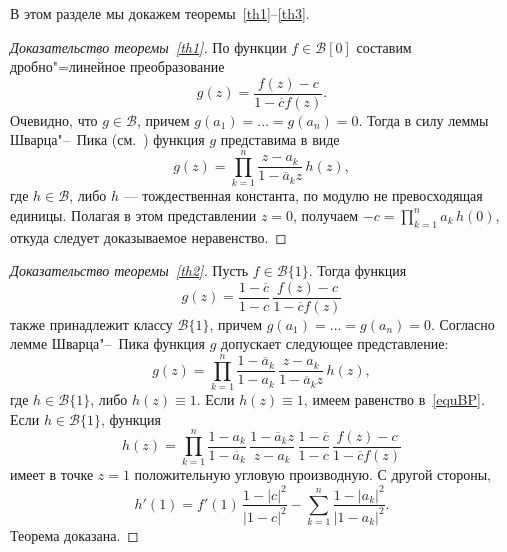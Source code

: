 \documentclass{article}
\theoremstyle{definition}
\theoremstyle{plain}
\begin{document}
 В этом разделе мы докажем теоремы~\ref{th1}--\ref{th3}.
\begin{proof}[Доказательство теоремы~\ref{th1}]
	По функции 	$f\in \mathscr B[0]$ составим дробно"=линейное преобразование
	\[
	g(z)=\frac{f(z)-c}{1-\overline{c}f(z)}.
	\]	
	Очевидно, что $g\in \mathscr B$, причем $g(a_1)=\ldots =g(a_n)=0$. Тогда в силу  леммы Шварца"--~Пика (см.~\cite[гл.~VIII, \S~1]{Goluzin})  функция $g$ представима в виде
	\begin{equation*}
		g(z)=\prod_{k=1}^{n}\frac{z-a_k}{1-\overline{a}_k z} \,h(z),	
	\end{equation*}	
	где $h\in \mathscr B$, либо $h$ --- тождественная константа, по модулю не превосходящая единицы. Полагая в этом представлении
	$z=0$, получаем $-c =\prod_{k=1}^{n}a_k \,h(0)$, откуда следует доказываемое неравенство.
\end{proof}	
\begin{proof}[Доказательство теоремы~\ref{th2}]
	Пусть  $f\in \mathscr B\{1\}$.
	Тогда функция
	\[
	g(z)=\frac{1-\overline{c}}{1-c}\,\frac{f(z)-c}{1-\overline{c}f(z)}
	\]	
	также принадлежит классу $\mathscr B\{1\}$, причем $g(a_1)=\ldots =g(a_n)=0$. Согласно лемме Шварца"--~Пика  функция $g$ допускает следующее представление:
	\begin{equation*}
		g(z)=
		\prod_{k=1}^{n}
		\frac{1-\overline{a}_k}{1-a_k}\,\frac{z-a_k}{1-\overline{a}_kz}\, h(z),	
	\end{equation*}	
	где $h\in \mathscr B\{1\}$, либо $h(z)\equiv 1$. Если $h(z)\equiv 1$, имеем равенство в~\eqref{equBP}. Если $h\in \mathscr B\{1\}$,
	функция
	\[
	h(z)=
	\prod_{k=1}^{n}
	\frac{1-a_k}{1-\overline{a}_k}\,\frac{1-\overline{a}_kz}{z-a_k}\, \frac{1-\overline{c}}{1-c}\,\frac{f(z)-c}{1-\overline{c}f(z)}
	\]
	имеет в точке $z=1$ положительную угловую производную. С другой стороны,
	\[
	h'(1)=f'(1)\,\frac{1-|c|^2}{|1-c|^2}-\sum_{k=1}^{n}\frac{1-|a_k|^2}{|1-a_k|^2}.
	\]
	Теорема доказана.
\end{proof}	
\end{document}
